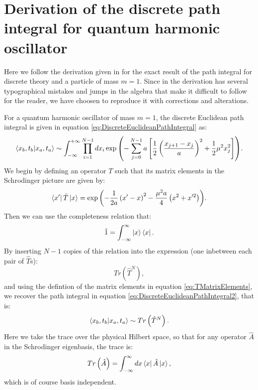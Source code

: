 \documentclass[12pt]{article}
\begin{document}
\appendix

\section{Derivation of the discrete path integral for quantum harmonic oscillator}
Here we follow the derivation given in \cite{creutz_freedman_1981} for the exact result of the path integral for discrete theory and a particle of mass $m=1$. Since in \cite{creutz_freedman_1981} the derivation has several typographical mistakes and jumps in the algebra that make it difficult to follow for the reader, we have choosen to reproduce it with corrections and alterations.

For a quantum harmonic oscillator of mass $m=1$, the discrete Euclidean path integral is given in equation \ref{eq:DiscreteEuclideanPathIntegral} as:
\begin{equation}
	\label{eq:DiscreteEuclideanPathIntegral2}
	\braket{x_b,t_b|x_a,t_a} \sim \int^{+\infty}_{-\infty}\prod_{i=1}^{N-1}dx_i \exp{\left(-\sum^{N-1}_{j=0} a \left[\frac{1}{2}\left(\frac{x_{j+1}-x_j}{a}\right)^2+\frac{1}{2}\mu^2x_{j}^2\right]\right)}.
\end{equation}
We begin by defining an operator $T$ such that its matrix elements in the Schrodinger picture are given by:
\begin{equation}
	\label{eq:TMatrixElements}
	\bra{x'}\hat{T}\ket{x} = \exp{\left(-\frac{1}{2a}\left(x'-x\right)^2-\frac{\mu^2a}{4}\left(x^2+x'^2\right)\right)}.
\end{equation}
Then we can use the completeness relation that:
\begin{equation}
	\label{eq:CompletenessRelation}
	\hat{1} = \int_{-\infty}^{\infty}\ket{x}\bra{x}.
\end{equation}
By inserting $N-1$ copies of this relation into the expression (one inbetween each pair of $\hat{T}$s):
\begin{equation}
	\label{eq:TraceT}
	Tr\left(\hat{T}^{N}\right),
\end{equation}
and using the defintion of the matrix elements in equation \ref{eq:TMatrixElements}, we recover the path integral in equation \ref{eq:DiscreteEuclideanPathIntegral2}, that is:
\begin{equation}
	\label{eq:PathIntegralAsTrace}
	\braket{x_b,t_b|x_a,t_a} \sim Tr\left(\hat{T}^N\right).
\end{equation}
Here we take the trace over the physical Hilbert space, so that for any operator $\hat{A}$ in the Schrodinger eigenbasis, the trace is:
\begin{equation}
	\label{eq:Trace}
	Tr\left(\hat{A}\right) = \int_{-\infty}^{\infty}dx\bra{x}\hat{A}\ket{x},
\end{equation}
which is of course basis independent.
\end{document}
